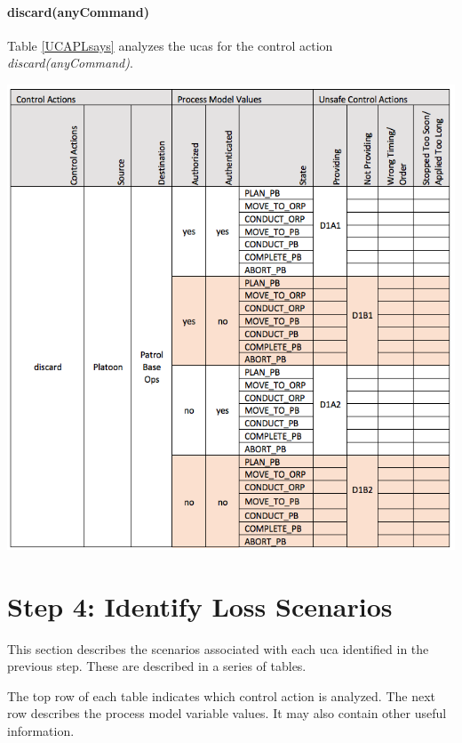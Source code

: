 \documentclass[../../main/main.tex]{subfiles}
\begin{document}
\paragraph*{discard(anyCommand)}
Table \ref{UCAPLsays} analyzes the \glspl{uca} for the control action \textit{discard(anyCommand)}.
\begin{table}[ht!]
\begin{center}
\includegraphics[width=\linewidth]{../figures/ucadiscards}
\caption{Unsafe control actions \glspl{uca} for control action "discard(anyCommand)."}
\label{UCAdiscard}
\end{center}
\end{table}
\clearpage
\section{Step 4: Identify Loss Scenarios}\label{chp:stpapb:scenarios}
This section describes the scenarios associated with each \gls{uca} identified in the previous step. These are described in a series of tables.  

The top row of each table indicates which control action is analyzed.  The next row describes the process model variable values.  It may also contain other useful information.
\end{document}
